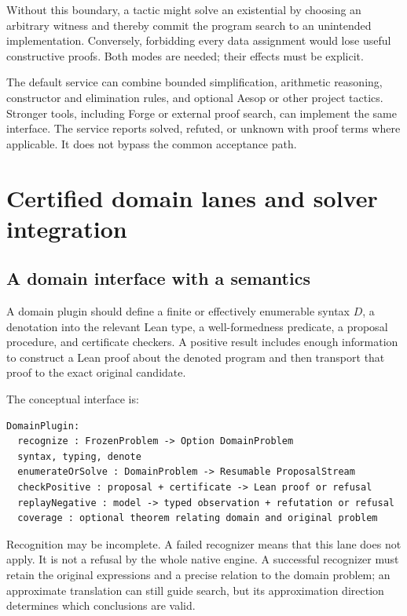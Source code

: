 Without this boundary, a tactic might solve an existential by choosing an arbitrary witness and thereby commit the program search to an unintended implementation. Conversely, forbidding every data assignment would lose useful constructive proofs. Both modes are needed; their effects must be explicit.

The default service can combine bounded simplification, arithmetic reasoning, constructor and elimination rules, and optional Aesop or other project tactics. Stronger tools, including Forge or external proof search, can implement the same interface. The service reports solved, refuted, or unknown with proof terms where applicable. It does not bypass the common acceptance path.

\section{Certified domain lanes and solver integration}
\label{sec:domains}

\subsection{A domain interface with a semantics}

A domain plugin should define a finite or effectively enumerable syntax $D$, a denotation into the relevant Lean type, a well-formedness predicate, a proposal procedure, and certificate checkers. A positive result includes enough information to construct a Lean proof about the denoted program and then transport that proof to the exact original candidate.

The conceptual interface is:
\par\noindent\begin{minipage}{\linewidth}
\begin{lstlisting}[language={}]
DomainPlugin:
  recognize : FrozenProblem -> Option DomainProblem
  syntax, typing, denote
  enumerateOrSolve : DomainProblem -> Resumable ProposalStream
  checkPositive : proposal + certificate -> Lean proof or refusal
  replayNegative : model -> typed observation + refutation or refusal
  coverage : optional theorem relating domain and original problem
\end{lstlisting}
\end{minipage}\par

Recognition may be incomplete. A failed recognizer means that this lane does not apply. It is not a refusal by the whole native engine. A successful recognizer must retain the original expressions and a precise relation to the domain problem; an approximate translation can still guide search, but its approximation direction determines which conclusions are valid.

